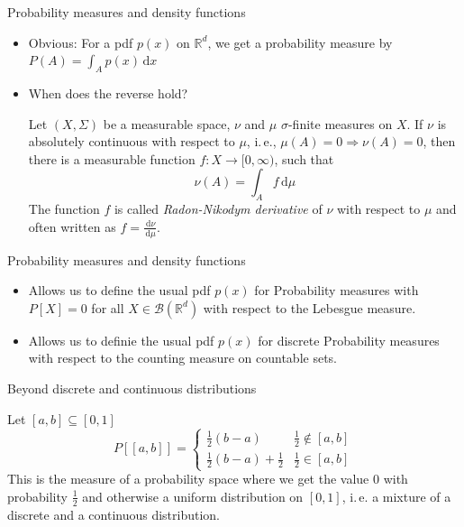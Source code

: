 \documentclass[compress]{beamer}
\newcommand{\RR}{\mathbb{R}}
\newcommand{\td}{\,\mathrm{d}}  %
\begin{document}
\begin{frame}{Probability measures and density functions}
  \begin{itemize}
  \item Obvious: For a pdf $p(x)$ on $\RR^d$, we get a probability measure by
    $P(A) = \int_A p(x)\td x$
  \item When does the reverse hold?
  \pause
  \begin{theorem}
    Let $(X, \Sigma)$ be a measurable space, $\nu$ and $\mu$ $\sigma$-finite
    measures on $X$. If $\nu$ is absolutely continuous with respect to $\mu$,
    i.\,e., $\mu(A) = 0 \Rightarrow \nu(A) = 0$, then there is a measurable
    function $f: X \to [0, \infty)$, such that
    \[
      \nu(A) = \int_A f \td \mu
    \]
    The function $f$ is called \textit{Radon-Nikodym derivative} of $\nu$ with
    respect to $\mu$ and often written as $f = \frac{\td \nu}{\td \mu}$.
  \end{theorem}
  \end{itemize}

\end{frame}

\begin{frame}{Probability measures and density functions}
  \begin{itemize}
  \item Allows us to define the usual pdf $p(x)$ for Probability measures with
    $P[X]=0$ for all $X \in \mathcal{B}(\RR^d)$ with respect to the Lebesgue
    measure.
  \item Allows us to definie the usual pdf $p(x)$ for discrete Probability
    measures with respect to the counting measure on countable sets.
  \end{itemize}
\end{frame}

\begin{frame}{Beyond discrete and continuous distributions}
  \begin{example}
    Let $[a,b]\subseteq [0,1]$
    \[
      P[[a,b]]=
      \begin{cases}
        \tfrac12(b-a) & \tfrac12 \notin [a,b]\\
        \tfrac12(b-a) + \tfrac12 & \frac12 \in [a,b]
      \end{cases}
    \]
    This is the measure of a probability space where we get the value $0$ with
    probability $\tfrac12$ and otherwise a uniform distribution on $[0,1]$,
    i.\,e. a mixture of a discrete and a continuous distribution.
  \end{example}
\end{frame}
\end{document}
